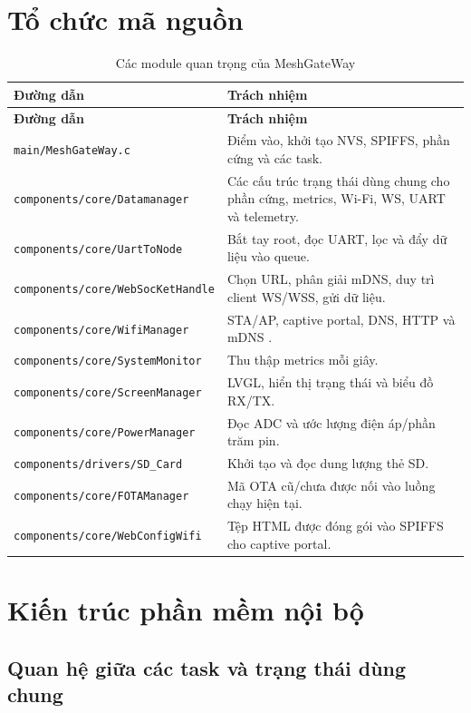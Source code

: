 \documentclass[a4paper]{article}
\newcommand{\pathcode}[1]{\nolinkurl{#1}}
\newcommand{\codeword}[1]{\texttt{\detokenize{#1}}}
\begin{document}
\section{Tổ chức mã nguồn}

\begin{longtable}{p{5.3cm}p{8.7cm}}
\caption{Các module quan trọng của MeshGateWay}\\
\toprule
\textbf{Đường dẫn} & \textbf{Trách nhiệm} \\
\midrule
\endfirsthead
\toprule
\textbf{Đường dẫn} & \textbf{Trách nhiệm} \\
\midrule
\endhead
\pathcode{main/MeshGateWay.c} & Điểm vào, khởi tạo NVS, SPIFFS, phần cứng và các task.\\
\pathcode{components/core/Datamanager} & Các cấu trúc trạng thái dùng chung cho phần cứng, metrics, Wi-Fi, WS, UART và telemetry.\\
\pathcode{components/core/UartToNode} & Bắt tay root, đọc UART, lọc và đẩy dữ liệu vào queue.\\
\pathcode{components/core/WebSocKetHandle} & Chọn URL, phân giải mDNS, duy trì client WS/WSS, gửi dữ liệu.\\
\pathcode{components/core/WifiManager} & STA/AP, captive portal, DNS, HTTP và mDNS \codeword{meshgateway.local}.\\
\pathcode{components/core/SystemMonitor} & Thu thập metrics mỗi giây.\\
\pathcode{components/core/ScreenManager} & LVGL, hiển thị trạng thái và biểu đồ RX/TX.\\
\pathcode{components/core/PowerManager} & Đọc ADC và ước lượng điện áp/phần trăm pin.\\
\pathcode{components/drivers/SD_Card} & Khởi tạo và đọc dung lượng thẻ SD.\\
\pathcode{components/core/FOTAManager} & Mã OTA cũ/chưa được nối vào luồng chạy hiện tại.\\
\pathcode{components/core/WebConfigWifi} & Tệp HTML được đóng gói vào SPIFFS cho captive portal.\\
\bottomrule
\end{longtable}

\section{Kiến trúc phần mềm nội bộ}

\subsection{Quan hệ giữa các task và trạng thái dùng chung}
\end{document}
